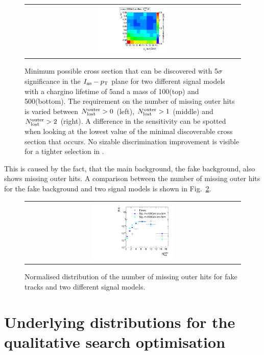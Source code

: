\begin{figure}[!h]
\begin{tabular}{c}
    \includegraphics[width=0.33\textwidth]{figures/analysis/Optimisation/Madgraph_signal_mass_500_ctau_5cm_ECaloLe5_SOverDeltaBStatPlusSys_2.pdf} 
  \end{tabular}
  \caption{Minimum possible cross section that can be discovered with 5$\sigma$ significance in the $I_{\text{as}} - p_{\text{T}}$ plane for two different signal models with a chargino lifetime of 5\cm and a mass of 100\gev (top) and 500\gev (bottom).
           The requirement on the number of missing outer hits is varied between $N_{\text{lost}}^{\text{outer}}>0$ (left), $N_{\text{lost}}^{\text{outer}}>1$ (middle) and $N_{\text{lost}}^{\text{outer}}>2$ (right). 
           A difference in the sensitivity can be spotted when looking at the lowest value of the minimal discoverable cross section that occurs.
           No sizable discrimination improvement is visible for a tighter selection in \nlostouter.}
  \label{fig:optimisationNLostOuter}
\end{figure} 
This is caused by the fact, that the main background, the fake background, also shows missing outer hits.
A comparison between the number of missing outer hits for the fake background and two signal models is shown in Fig.~\ref{fig:NLostOuterFakeSignal}.
\begin{figure}[!h]
  \centering 
  \begin{tabular}{c}
    \includegraphics[width=0.39\textwidth]{figures/analysis/Optimisation/NLostOuterForFakes_chiTracksfullSelectionNoQCDCutsNoTrigger.pdf} 
  \end{tabular}
  \caption{Normalised distribution of the number of missing outer hits for fake tracks and two different signal models. }
  \label{fig:NLostOuterFakeSignal}
\end{figure} 

\FloatBarrier
\section{Underlying distributions for the qualitative search optimisation}
\label{app:OptimisationApp}

